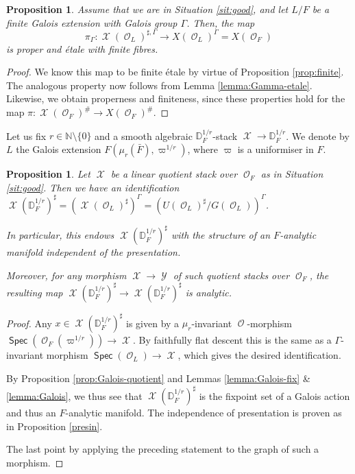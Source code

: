 \documentclass{article}
\DeclareMathOperator{\Xc}{\mathcal{X}}
\DeclareMathOperator{\Oc}{\mathcal{O}}
\DeclareMathOperator{\Spec}{\mathsf{Spec}}
\DeclareMathOperator{\Yc}{\mathcal{Y}}
\newcommand{\Dr}[1][r]{\mathbb{D}_F^{1/#1}}
\theoremstyle{definition}
\theoremstyle{plain}
\newtheorem{proposition}[definition]{Proposition}
\begin{document}
\begin{proposition}\label{prop:Gamma-finite}
Assume that we are in Situation \ref{sit:good}, and let $L/F$ be a finite Galois extension with Galois group $\Gamma$. Then, the map
$$\pi_{\Gamma}\colon \Xc(\Oc_L)^{\sharp,\Gamma} 
\to X(\Oc_L)^\Gamma=X(\Oc_F)$$
is proper and \'etale with finite fibres.
\end{proposition}
\begin{proof}
    We know this map to be finite \'etale by virtue of Proposition \ref{prop:finite}. The analogous property now follows from Lemma \ref{lemma:Gamma-etale}. Likewise, we obtain properness and finiteness, since these properties hold for the map $\pi \colon \Xc(\Oc_F)^{\#}\to X(\Oc_F)^{\#}$.
\end{proof}


Let us fix $r \in \mathbb{N} \setminus \{0\}$ and a smooth algebraic $\Dr$-stack $\Xc \to \Dr$.
We denote by $L$ the Galois extension $F(\mu_r(\bar F),\varpi^{1/r})$, where $\varpi$ is a uniformiser in $F$. 


\begin{proposition}\label{defi:r-points}
Let $\Xc$ be a linear quotient stack over $\Oc_F$ as in Situation \ref{sit:good}. Then we have an identification $\Xc(\Dr)^{\sharp} =(\Xc(\Oc_L)^\sharp)^{\Gamma}= (U(\Oc_L)^\sharp/G(\Oc_L))^\Gamma$.

In particular, this endows $\Xc(\Dr)^{\sharp}$ with the structure of an $F$-analytic manifold independent of the presentation.  

Moreover, for any morphism $\Xc \to \Yc$ of such quotient stacks over $\Oc_F$, the resulting map $\Xc(\Dr)^{\sharp} \to \Xc(\Dr)^{\sharp}$ is analytic. 
\end{proposition}
\begin{proof}
Any $x \in \Xc(\Dr)^{\sharp}$ is given by a $\mu_r$-invariant $\Oc$-morphism $\Spec(\Oc_F(\varpi^{1/r})) \to \Xc$. By faithfully flat descent this is the same as a $\Gamma$-invariant morphism $\Spec(\Oc_L) \to \Xc$, which gives the desired identification. 

 By Proposition \ref{prop:Galois-quotient} and Lemmas \ref{lemma:Galois-fix} \& \ref{lemma:Galois}, we thus see that $\Xc(\Dr)^{\sharp}$ is the fixpoint set of a Galois action and thus an $F$-analytic manifold. The independence of presentation is proven as in Proposition \ref{presin}.    

 The last point by applying the preceding statement to the graph of such a morphism.
\end{proof}
\end{document}
